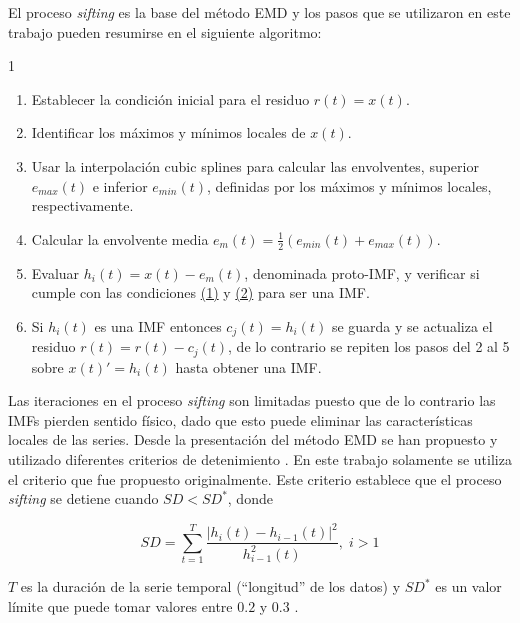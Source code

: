 El proceso \textit{sifting} es la base del método EMD y los pasos que se utilizaron en este trabajo pueden resumirse en el siguiente algoritmo:    

\begin{spacing}{1}
    \begin{enumerate}[label=\arabic*.]
        \item Establecer la condición inicial para el residuo $r(t) = x(t)$.
        \item Identificar los máximos y mínimos locales de $x(t)$. 
        \item Usar la interpolación cubic splines para calcular las envolventes, superior $e_{max}(t)$ e inferior $e_{min}(t)$, definidas por los máximos y mínimos locales, respectivamente.  
        \item Calcular la envolvente media $e_{m}(t) = \frac{1}{2}(e_{min}(t) + e_{max}(t))$.
        \item Evaluar $h_{i}(t) = x(t) - e_{m}(t)$, denominada proto-IMF, y verificar si cumple con las condiciones \hyperlink{imfs_cond1}{(1)} y \hyperlink{imfs_cond2}{(2)} para ser una IMF.
        \item Si $h_{i}(t)$ es una IMF entonces $c_{j}(t) = h_{i}(t)$ se guarda y se actualiza el residuo $r(t) = r(t) - c_{j}(t)$, de lo contrario se repiten los pasos del 2 al 5 sobre $x(t)' = h_{i}(t)$ hasta obtener una IMF.    
    \end{enumerate}
\end{spacing}

Las iteraciones en el proceso \textit{sifting} son limitadas puesto que de lo contrario las IMFs pierden sentido físico, dado que esto puede eliminar las características locales de las series. Desde la presentación del método EMD se han propuesto y utilizado diferentes criterios de detenimiento \cite{rilling_empirical_nodate, flandrin_empirical_2004, de_michelis_multi-scale_2012}. En este trabajo solamente se utiliza el criterio que fue propuesto originalmente. Este criterio establece que el proceso \textit{sifting} se detiene cuando $SD<SD^{*}$, donde

\begin{equation}
    SD = \sum_{t=1}^{T} \dfrac{|h_{i}(t) - h_{i-1}(t)|^2}{h_{i-1}^{2}(t)},  \; i>1
    \label{SD_criterion}
\end{equation}

$T$ es la duración de la serie temporal (``longitud” de los datos) y $SD^{*}$ es un valor límite que puede tomar valores entre $0.2$ y $0.3$ \cite{huang_empirical_1998}.

